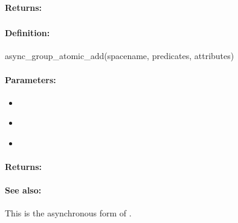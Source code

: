 \paragraph{Returns:}


\pagebreak
\subsubsection{}
\label{api:ruby:async_group_atomic_add}


\paragraph{Definition:}
\begin{rubycode}
async_group_atomic_add(spacename, predicates, attributes)
\end{rubycode}

\paragraph{Parameters:}
\begin{itemize}[noitemsep]
\item {}\\

\item {}\\

\item {}\\

\end{itemize}

\paragraph{Returns:}


\paragraph{See also:}  This is the asynchronous form of .

\pagebreak
\subsubsection{}
\label{api:ruby:atomic_sub}



